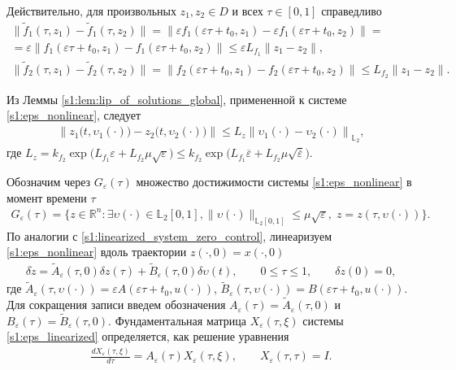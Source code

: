 \documentclass[../main.tex]{subfiles}
\begin{document}
Действительно, для произвольных $z_1, z_2 \in D$ и всех  $\tau \in [0, 1]$ справедливо
\begin{gather*}
	\|  \widetilde{f}_1(\tau, z_1) -  \widetilde{f}_1(\tau, z_2) \| = \|  \varepsilon f_1(\varepsilon \tau + t_0, z_1) -   \varepsilon f_1(\varepsilon \tau + t_0, z_2) \| = \\ =
	\varepsilon \|  f_1(\varepsilon \tau + t_0, z_1) -  f_1(\varepsilon \tau + t_0, z_2) \| \leqslant \varepsilon L_{f_1} \|z_1 - z_2 \|, \\
	\| \widetilde{f}_2 (\tau,z_1) - \widetilde{f}_2 (\tau,z_2) \| =  \| f_2(\varepsilon \tau + t_0,z_1) - f_2(\varepsilon \tau + t_0,z_2) \| \leqslant  L_{f_2} \|z_1 - z_2 \|.
\end{gather*}
    
Из  Леммы \ref{s1:lem:lip_of_solutions_global}, примененной  к системе \eqref{s1:eps_nonlinear}, следует
\begin{gather*}
    \left\| z_1\big(t, \upsilon_1(\cdot) \big) - z_2\big(t, \upsilon_2(\cdot)\big) \right\| \leqslant L_z \left\|\upsilon_1(\cdot) - \upsilon_2(\cdot) \right\|_{\mathbb{L}_2},
\end{gather*}
где $ L_z = k_{f_2} \exp\Big( L_{f_1} \varepsilon + L_{f_2} \mu \sqrt{\varepsilon} \Big) \leqslant k_{f_2} \exp\Big( L_{f_1} \overline{\varepsilon} + L_{f_2} \mu \sqrt{\overline{\varepsilon}} \Big)$.
    
Обозначим через $G_{\varepsilon}(\tau)$ множество достижимости системы \eqref{s1:eps_nonlinear} в момент времени $\tau$
\begin{gather*}
    G_{\varepsilon}(\tau) = \{z\in \mathbb{R}^n:\exists \upsilon(\cdot)\in \mathbb{L}_2[0,1],  \lVert \upsilon(\cdot)\rVert_{\mathbb{L}_2[0,1]}
    \leqslant  \mu \sqrt{\varepsilon}, \; z=z(\tau, \upsilon(\cdot))\}.
\end{gather*}
По аналогии с \eqref{s1:linearized_system_zero_control}, линеаризуем \eqref{s1:eps_nonlinear} вдоль траектории $ z(\cdot,0) = x(\cdot, 0) $
\begin{gather}\label{s1:eps_linearized}
    \delta\dot{z} = \widetilde{A}_{\varepsilon}(\tau, 0) \delta z(\tau) +\widetilde{B}_{\varepsilon}(\tau, 0) \delta \upsilon(t),\qquad 0 \leqslant \tau \leqslant 1,  \qquad \delta z(0) = 0,
\end{gather}
где $ \widetilde{A}_{\varepsilon}(\tau, \upsilon(\cdot)) = \varepsilon A(\varepsilon \tau + t_0, u(\cdot)) $,  $\widetilde{B}_{\varepsilon}(\tau, \upsilon(\cdot)) = B(\varepsilon \tau + t_0, u(\cdot)) $. 
Для сокращения записи введем обозначения $A_{\varepsilon}(\tau) = \widetilde{A}_{\varepsilon}(\tau, 0)$ и $B_{\varepsilon}(\tau) = \widetilde{B}_{\varepsilon}(\tau, 0)$.
Фундаментальная матрица $ X_{\varepsilon}(\tau,\xi) $ системы \eqref{s1:eps_linearized} определяется, как решение уравнения
\begin{gather*}
    \frac{dX_{\varepsilon}(\tau,\xi)}{d\tau} = A_{\varepsilon}(\tau) X_{\varepsilon}(\tau,\xi), \qquad X_{\varepsilon}(\tau,\tau) = I. 
\end{gather*}
\end{document}
